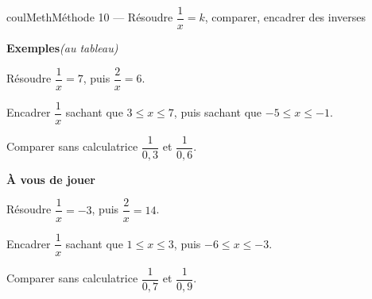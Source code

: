 \documentclass[11pt,a4paper]{article}
\makeatletter
\renewcommand{\le}{\leqslant}
\newcounter{lycee@signet}
\newcommand{\signet}[3][]{\stepcounter{lycee@signet}%
  \edef\lycee@dest{\if\relax\detokenize{#1}\relax
    signet.\arabic{lycee@signet}\else#1\fi}%
  \hypertarget{\lycee@dest}{}\bookmark[level=#2,dest=\lycee@dest]{#3}}
\newcounter{methode}
\newenvironment{methodebox}[1][Méthode]{\stepcounter{methode}%
  \begin{boitecours}[phantom={\signet[methode-\arabic{methode}]{2}{#1}}]{coulMeth}{#1}}%
  {\end{boitecours}}
\newcommand{\etape}[1]{\par\smallskip\textbf{\color{coulMeth}#1}\par\nobreak\smallskip}
\newcommand{\autableau}{\hfill{\footnotesize\itshape\color{black!45}(au tableau)}}
\newcommand{\etapeexemples}{%
    \par\smallskip\textbf{\color{coulMeth}Exemples}\autableau\par\nobreak\smallskip}
\makeatother
\begin{document}
\begin{methodebox}[Méthode 10 --- Résoudre $\dfrac{1}{x}=k$, comparer, encadrer des inverses]
\etapeexemples
\begin{questions}[label=\alph*)]
  \item Résoudre $\dfrac{1}{x}=7$, puis $\dfrac{2}{x}=6$.
  \item Encadrer $\dfrac{1}{x}$ sachant que $3\le x\le 7$, puis sachant que
        $-5\le x\le -1$.
  \item Comparer sans calculatrice $\dfrac{1}{0{,}3}$ et $\dfrac{1}{0{,}6}$.
\end{questions}

\etape{À vous de jouer}
\begin{questions}
  \item Résoudre $\dfrac{1}{x}=-3$, puis $\dfrac{2}{x}=14$.
  \item Encadrer $\dfrac{1}{x}$ sachant que $1\le x\le 3$, puis $-6\le x\le -3$.
  \item Comparer sans calculatrice $\dfrac{1}{0{,}7}$ et $\dfrac{1}{0{,}9}$.
\end{questions}

\end{methodebox}
\end{document}
